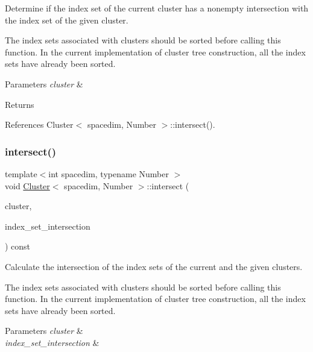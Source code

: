 Determine if the index set of the current cluster has a nonempty intersection with the index set of the given cluster.


\begin{DoxyDescription}
\item[Note ]The index sets associated with clusters should be sorted before calling this function. In the current implementation of cluster tree construction, all the index sets have already been sorted. 
\end{DoxyDescription}
\begin{DoxyParams}{Parameters}
{\em cluster} & \\
\hline
\end{DoxyParams}
\begin{DoxyReturn}{Returns}

\end{DoxyReturn}


References Cluster$<$ spacedim, Number $>$\+::intersect().

\mbox{\label{classCluster_a47961c1b0a34b58266aa3bd87fd36b32}} 
\subsubsection{\texorpdfstring{intersect()}{intersect()}}
{\footnotesize\ttfamily template$<$int spacedim, typename Number $>$ \\
void \hyperlink{classCluster}{Cluster}$<$ spacedim, Number $>$\+::intersect (\begin{DoxyParamCaption}\item[{const \hyperlink{classCluster}{Cluster}$<$ spacedim, Number $>$ \&}]{cluster,  }\item[{std\+::vector$<$ types\+::global\+\_\+dof\+\_\+index $>$ \&}]{index\+\_\+set\+\_\+intersection }\end{DoxyParamCaption}) const}

Calculate the intersection of the index sets of the current and the given clusters.


\begin{DoxyDescription}
\item[Note ]The index sets associated with clusters should be sorted before calling this function. In the current implementation of cluster tree construction, all the index sets have already been sorted. 
\end{DoxyDescription}
\begin{DoxyParams}{Parameters}
{\em cluster} & \\
\hline
{\em index\+\_\+set\+\_\+intersection} & \\
\hline
\end{DoxyParams}


